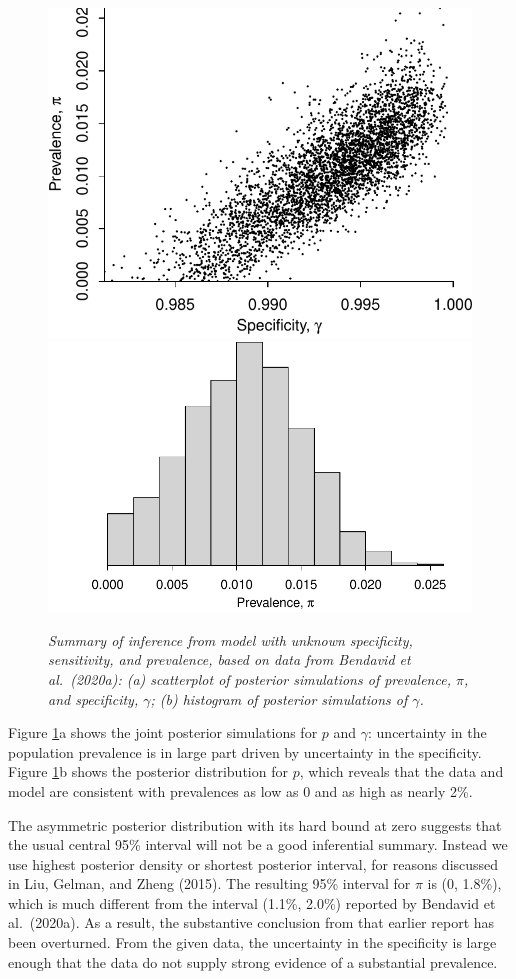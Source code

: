\documentclass[11pt]{article}
\begin{document}
 \begin{figure}
\centerline{ \includegraphics[width=.45\textwidth]{scatter.pdf} \includegraphics[width=.55\textwidth]{hist.pdf}}
\caption{\em Summary of inference from model with unknown specificity, sensitivity, and prevalence, based on data from Bendavid et al.\ (2020a):  (a) scatterplot of posterior simulations of prevalence, $\pi$, and specificity, $\gamma$; (b) histogram of posterior simulations of $\gamma$.}
\label{posterior1}
\end{figure} 

Figure \ref{posterior1}a shows the joint posterior simulations for $p$ and $\gamma$:  uncertainty in the population prevalence is in large part driven by uncertainty in the specificity.  Figure \ref{posterior1}b shows the posterior distribution for $p$, which reveals that the data and model are consistent with prevalences as low as 0 and as high as nearly 2\%.

The asymmetric posterior distribution with its hard bound at zero suggests that the usual central 95\% interval will not be a good inferential summary.  Instead we use highest posterior density or shortest posterior interval, for reasons discussed in Liu, Gelman, and Zheng (2015). The resulting 95\% interval for $\pi$ is (0, 1.8\%), which is much different from the interval (1.1\%, 2.0\%) reported by Bendavid et al.\ (2020a).  As a result, the substantive conclusion from that earlier report has been overturned. From the given data, the uncertainty in the specificity is large enough that the data do not supply strong evidence of a substantial prevalence.
\end{document}
